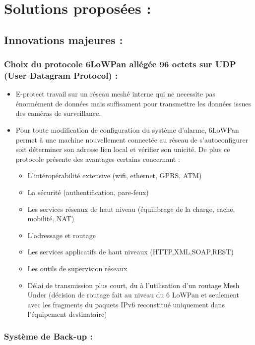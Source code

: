 \chapter{Solutions proposées :}

\section{Innovations majeures :}

\subsection{Choix du protocole 6LoWPan allégée 96 octets sur UDP (User Datagram Protocol) :}

\begin{itemize}
	\item E-protect travail sur un réseau meshé interne qui ne necessite pas énormément de données mais suffisament pour transmettre les données issues des caméras de surveillance.
	\item Pour toute modification de configuration du système d'alarme, 6LoWPan permet à une machine nouvellement connectée au réseau de s'autoconfigurer soit déterminer son adresse lien local et vérifier son unicité. De plus ce protocole présente des avantages certains concernant :
	\begin{itemize}
		\item L'intéropérabilité extensive (wifi, ethernet, GPRS, ATM)
		\item La sécurité (authentification, pare-feux)
		\item Les services réseaux de haut niveau (équilibrage de la charge, cache, mobilité, NAT)
		\item L'adressage et routage
		\item Les services applicatifs de haut niveaux (HTTP,XML,SOAP,REST)
		\item Les outils de supervision réseaux
		\item Délai de transmission plus court, du à l’utilisation d’un routage Mesh Under (décision de routage fait au niveau du 6 LoWPan et seulement avec les fragments du paquets IPv6 reconstitué uniquement dans l'équipement destinataire)\cite{www:6LoWPan}\\
	\end{itemize}
\end{itemize}


\subsection{Système de Back-up :}

